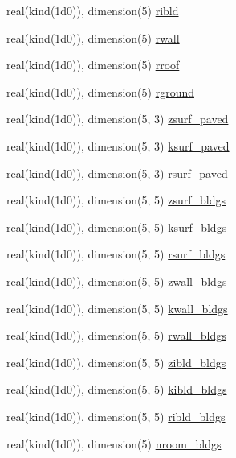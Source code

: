\begin{DoxyCompactItemize}
real(kind(1d0)), dimension(5) \hyperlink{namespaceestm__data_aeec5613d21243119700929bc31e4bef4}{ribld}
\item 
real(kind(1d0)), dimension(5) \hyperlink{namespaceestm__data_a76d29d9454cc82038e887a185e8e0c08}{rwall}
\item 
real(kind(1d0)), dimension(5) \hyperlink{namespaceestm__data_aab36dbd44cebff7b2d6bf3c8c505eca9}{rroof}
\item 
real(kind(1d0)), dimension(5) \hyperlink{namespaceestm__data_ae940330d6806444c16f7c8a9195800cf}{rground}
\item 
real(kind(1d0)), dimension(5, 3) \hyperlink{namespaceestm__data_a76774423276b4ee98c2791e6f3c601e6}{zsurf\+\_\+paved}
\item 
real(kind(1d0)), dimension(5, 3) \hyperlink{namespaceestm__data_ad0be589bd6851290e89cc3c869fce8ee}{ksurf\+\_\+paved}
\item 
real(kind(1d0)), dimension(5, 3) \hyperlink{namespaceestm__data_a263d4ea8134834255e133ba3ba191efc}{rsurf\+\_\+paved}
\item 
real(kind(1d0)), dimension(5, 5) \hyperlink{namespaceestm__data_af0b3ee5c82caffde6cad59e53acf41a2}{zsurf\+\_\+bldgs}
\item 
real(kind(1d0)), dimension(5, 5) \hyperlink{namespaceestm__data_af810783ea0a93838a243c98f96300d07}{ksurf\+\_\+bldgs}
\item 
real(kind(1d0)), dimension(5, 5) \hyperlink{namespaceestm__data_ae021e526e3850da2a5683c8834e829e1}{rsurf\+\_\+bldgs}
\item 
real(kind(1d0)), dimension(5, 5) \hyperlink{namespaceestm__data_a8d30efb7069d9f6ffbca3a762b2ec9ef}{zwall\+\_\+bldgs}
\item 
real(kind(1d0)), dimension(5, 5) \hyperlink{namespaceestm__data_aa4f90c738693b129665f892f3eeb616c}{kwall\+\_\+bldgs}
\item 
real(kind(1d0)), dimension(5, 5) \hyperlink{namespaceestm__data_aba856f5539c396e0cf8f9b6fafef6511}{rwall\+\_\+bldgs}
\item 
real(kind(1d0)), dimension(5, 5) \hyperlink{namespaceestm__data_a67d990e0db5db8d922ab38d6f4c0ec70}{zibld\+\_\+bldgs}
\item 
real(kind(1d0)), dimension(5, 5) \hyperlink{namespaceestm__data_a77620242922d0fa7a2312ae03e464ce8}{kibld\+\_\+bldgs}
\item 
real(kind(1d0)), dimension(5, 5) \hyperlink{namespaceestm__data_a8ecb43f42e5bf6e0baa8109e38e010bd}{ribld\+\_\+bldgs}
\item 
real(kind(1d0)), dimension(5) \hyperlink{namespaceestm__data_aeae0b58494bd32de61b8f33c59ec8a35}{nroom\+\_\+bldgs}

\end{DoxyCompactItemize}
